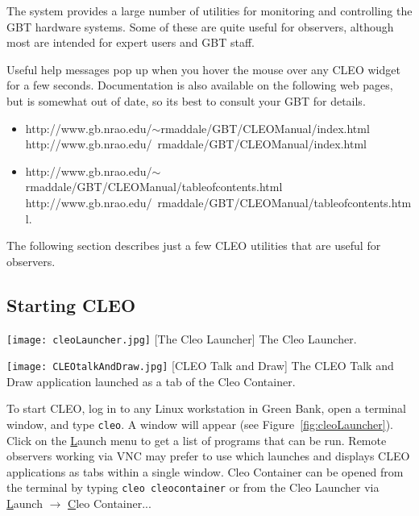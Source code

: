 The  system provides a large number of utilities for monitoring
and controlling the GBT hardware systems. Some of these are quite useful for observers,
although most are intended for expert users and \gls{GBT} staff.

Useful help messages pop up when you hover the mouse over any \gls{CLEO} widget for a
few seconds.  Documentation is also available on the following web pages, but is somewhat
out of date, so its best to consult your \gls{GBT}  for details.
\begin{itemize}
\item \htmladdnormallink
{http://www.gb.nrao.edu/$\sim$rmaddale/GBT/CLEOManual/index.html}
{http://www.gb.nrao.edu/~rmaddale/GBT/CLEOManual/index.html}
\item \htmladdnormallink
{http://www.gb.nrao.edu/$\sim$rmaddale/GBT/CLEOManual/tableofcontents.html}
{http://www.gb.nrao.edu/~rmaddale/GBT/CLEOManual/tableofcontents.html}.
\end{itemize}

\noindent The following section describes just a few \gls{CLEO} utilities that are
useful for observers.

\subsection{Starting CLEO}

\noindent\begin{minipage}[b]{0.29\linewidth}
\vspace{0pt}
\captionsetup{
  justification=raggedright,
  singlelinecheck=false
}
\texttt{[image: cleoLauncher.jpg]}
[The Cleo Launcher]
{The Cleo Launcher.
\label{fig:cleoLauncher}}
\end{minipage}
\hfill
\noindent \begin{minipage}[b]{0.685\linewidth}
\vspace{0pt}
\texttt{[image: CLEOtalkAndDraw.jpg]}
[CLEO Talk and Draw]
{The \gls{CLEO} Talk and Draw application launched as a tab of the Cleo Container.
\label{fig:CLEOtalkanddraw}}
\end{minipage}

To start \gls{CLEO}, log in to any Linux workstation in Green Bank, open a terminal 
window, and type {\tt cleo}.  A  window will appear
(see Figure~\ref{fig:cleoLauncher}).  Click on the {\btt \underline{L}aunch} menu
to get a list of programs that can be run.  Remote observers working via \gls{VNC} may
prefer to use  which launches and displays \gls{CLEO} applications
as tabs within a single window.  Cleo Container can be opened from the terminal by typing 
{\tt cleo cleocontainer} or from the Cleo Launcher via\\
{\btt \underline{L}aunch} $\rightarrow$ {\btt \underline{C}leo Container...}

